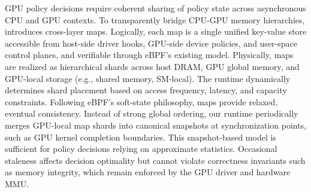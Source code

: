 GPU policy decisions require coherent sharing of policy state across asynchronous CPU and GPU contexts. To transparently bridge CPU-GPU memory hierarchies, \sys introduces cross-layer maps. Logically, each map is a single unified key-value store accessible from host-side driver hooks, GPU-side device policies, and user-space control planes, and verifiable through eBPF's existing model. Physically, maps are realized as hierarchical shards across host DRAM, GPU global memory, and GPU-local storage (e.g., shared memory, SM-local). The runtime dynamically determines shard placement based on access frequency, latency, and capacity constraints. Following eBPF's soft-state philosophy, \sys maps provide relaxed, eventual consistency. Instead of strong global ordering, our runtime periodically merges GPU-local map shards into canonical snapshots at synchronization points, such as GPU kernel completion boundaries. This snapshot-based model is sufficient for policy decisions relying on approximate statistics. Occasional staleness affects decision optimality but cannot violate correctness invariants such as memory integrity, which remain enforced by the GPU driver and hardware MMU.
